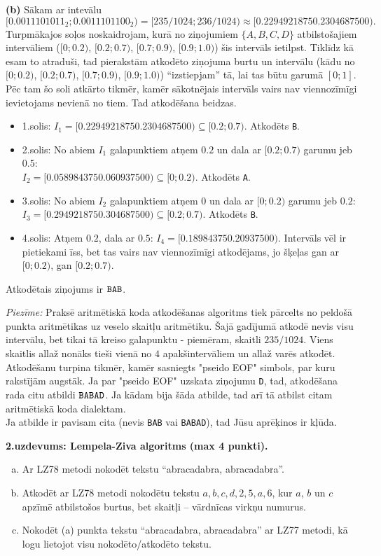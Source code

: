 \documentclass[11pt]{article}
\begin{document}
\noindent
{\bf (b)} Sākam ar intevālu 
$$[0.0011101011_2;0.0011101100_2) = [235/1024;236/1024) \approx [0.2294921875 0.2304687500).$$
Turpmākajos soļos noskaidrojam, kurā no ziņojumiem $\{ A,B,C,D \}$ atbilstošajiem intervāliem
($[0;0.2)$, $[0.2;0.7)$, $[0.7;0.9)$, $[0.9;1.0)$) šis intervāls ietilpst. 
Tiklīdz kā esam to atraduši, tad pierakstām atkodēto ziņojuma burtu un 
intervālu (kādu no $[0;0.2)$, $[0.2;0.7)$, $[0.7;0.9)$, $[0.9;1.0)$) ``izstiepjam'' tā, 
lai tas būtu garumā $[0;1]$. Pēc tam šo soli atkārto tikmēr, kamēr sākotnējais intervāls 
vairs nav viennozīmīgi ievietojams nevienā no tiem. Tad atkodēšana beidzas. 

\begin{itemize}
\item 1.solis: $I_1 = [0.2294921875 0.2304687500) \subseteq [0.2;0.7)$. Atkodēts {\tt B}.
\item 2.solis: No abiem $I_1$ galapunktiem atņem $0.2$ un dala ar $[0.2;0.7)$ garumu jeb $0.5$:\\
$I_2 = [0.058984375 0.060937500) \subseteq [0;0.2)$. Atkodēts {\tt A}.
\item 3.solis: No abiem $I_2$ galapunktiem atņem $0$ un dala ar $[0;0.2)$ garumu jeb $0.2$:\\
$I_3 = [0.294921875 0.304687500) \subseteq [0.2;0.7)$. Atkodēts {\tt B}.
\item 4.solis: Atņem $0.2$, dala ar $0.5$: $I_4 = [0.18984375 0.20937500)$. Intervāls vēl ir pietiekami 
īss, bet tas vairs nav viennozīmīgi atkodējams, jo šķeļas gan ar $[0;0.2)$, gan $[0.2;0.7)$. 
\end{itemize}

Atkodētais ziņojums ir ${\tt BAB}$. 

{\em Piezīme:} Praksē aritmētiskā koda atkodēšanas algoritms tiek pārcelts no peldošā punkta aritmētikas uz veselo skaitļu aritmētiku. 
Šajā gadījumā atkodē nevis visu intervālu, bet tikai tā kreiso galapunktu - piemēram, skaitli $235/1024$. 
Viens skaitlis allaž nonāks tieši vienā no $4$ apakšintervāliem un allaž varēs atkodēt.
Atkodēšanu turpina tikmēr, kamēr sasniegts "pseido EOF" simbols, par kuru rakstījām augstāk. 
Ja par "pseido EOF" uzskata ziņojumu {\tt D}, tad, atkodēšana rada citu atbildi ${\tt BABAD}$. 
Ja kādam bija šāda atbilde, tad arī tā atbilst citam aritmētiskā koda dialektam.\\
Ja atbilde ir pavisam cita (nevis {\tt BAB} vai {\tt BABAD}), tad Jūsu aprēķinos ir kļūda.




{\footnotesize 
\vspace{10ex}
\noindent
{\bf 2.uzdevums: Lempela-Ziva algoritms (max 4 punkti).}
\begin{enumerate}[(a)]
\item 
Ar LZ78 metodi nokodēt tekstu “abracadabra, abracadabra”.
\item Atkodēt ar LZ78 metodi nokodētu tekstu $a,b,c,d,2,5,a,6$, kur
$a$, $b$ un $c$ apzīmē atbilstošos burtus, bet skaitļi – vārdnīcas virkņu
numurus.
\item
Nokodēt (a) punkta tekstu “abracadabra, abracadabra” 
ar LZ77 metodi, kā logu lietojot visu nokodēto/atkodēto tekstu.
\end{enumerate}
}
\end{document}
